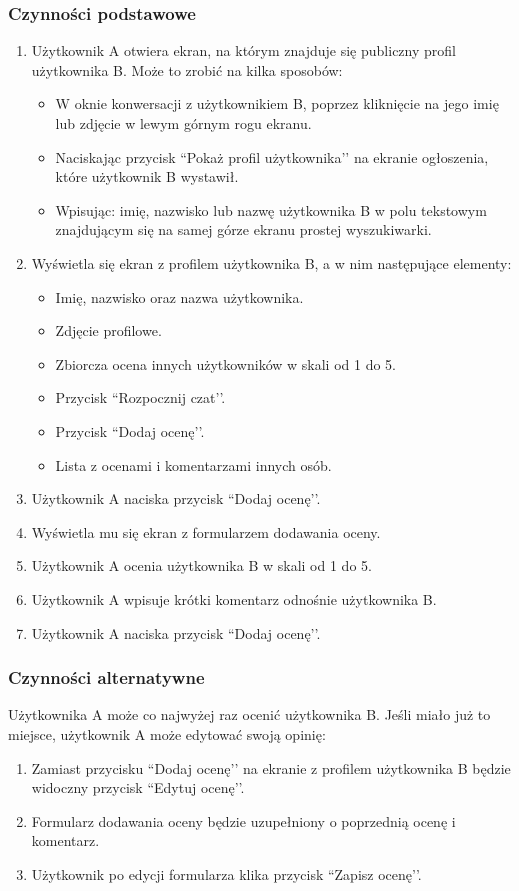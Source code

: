 \documentclass[licencjacka]{pracamgr}
\begin{document}
    \subsubsection{Czynności podstawowe}
    \begin{enumerate}
        \item Użytkownik A otwiera ekran, na którym znajduje się publiczny profil użytkownika B. Może to zrobić na kilka sposobów:
        \begin{itemize}
            \item W oknie konwersacji z użytkownikiem B, poprzez kliknięcie na jego imię lub zdjęcie w lewym górnym rogu ekranu.
            \item Naciskając przycisk ``Pokaż profil użytkownika’’ na ekranie ogłoszenia, które użytkownik B wystawił.
            \item Wpisując: imię, nazwisko lub nazwę użytkownika B w polu tekstowym znajdującym się na samej górze ekranu prostej wyszukiwarki.
        \end{itemize}
        \item Wyświetla się ekran z profilem użytkownika B, a w nim następujące elementy:
        \begin{itemize}
            \item Imię, nazwisko oraz nazwa użytkownika.
            \item Zdjęcie profilowe.
            \item Zbiorcza ocena innych użytkowników w skali od 1 do 5.
            \item Przycisk ``Rozpocznij czat’’.
            \item Przycisk ``Dodaj ocenę’’.
            \item Lista z ocenami i komentarzami innych osób.
        \end{itemize}
        \item Użytkownik A naciska przycisk ``Dodaj ocenę’’.
        \item Wyświetla mu się ekran z formularzem dodawania oceny.
        \item Użytkownik A ocenia użytkownika B w skali od 1 do 5.
        \item Użytkownik A wpisuje krótki komentarz odnośnie użytkownika B.
        \item Użytkownik A naciska przycisk ``Dodaj ocenę’’.
    \end{enumerate}
    \subsubsection{Czynności alternatywne}
    Użytkownika A może co najwyżej raz ocenić użytkownika B. Jeśli miało już to miejsce, użytkownik A może edytować swoją opinię:
    \begin{enumerate}
        \item Zamiast przycisku ``Dodaj ocenę’’ na ekranie z profilem użytkownika B będzie widoczny przycisk ``Edytuj ocenę’’.
        \item Formularz dodawania oceny będzie uzupełniony o poprzednią ocenę i komentarz.
        \item Użytkownik po edycji formularza klika przycisk ``Zapisz ocenę’’.
    \end{enumerate}
\end{document}
